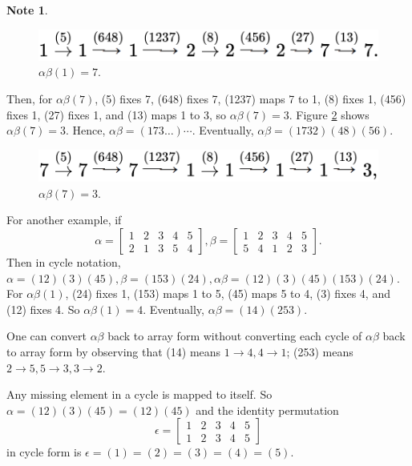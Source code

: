 \documentclass{article}
\theoremstyle{definition}
\newtheorem{note}{Note}[section]
\begin{document}
\begin{note}
 \begin{figure}[!htbp]
     \centering
     \includegraphics[width=0.5\linewidth]{figures/alphabeta(1).png}
     \caption{$\alpha\beta(1)=7$.}
     \label{alpha_beta(1)}
 \end{figure}
 
 Then, for $\alpha\beta(7)$, (5) fixes 7, (648) fixes 7, (1237) maps 7 to 1, (8) fixes 1, (456) fixes 1, (27) fixes 1, and (13) maps 1 to 3, so $\alpha\beta(7)=3$. Figure \ref{alpha_beta(7)} shows $\alpha\beta(7)=3$. Hence, $\alpha\beta = (173\dots)\cdots$. Eventually, $\alpha\beta = (1732)(48)(56)$.
 
 \begin{figure}[!htbp]
     \centering
     \includegraphics[width=0.5\linewidth]{figures/alphabeta(7).png}
     \caption{$\alpha\beta(7)=3$.}
     \label{alpha_beta(7)}
 \end{figure}
 
 For another example, if 
 \begin{equation*}
     \alpha = 
     \begin{bmatrix}
        1 & 2 & 3 & 4 & 5 \\
        2 & 1 & 3 & 5 & 4 
     \end{bmatrix},
     \beta = 
     \begin{bmatrix}
        1 & 2 & 3 & 4 & 5 \\
        5 & 4 & 1 & 2 & 3 
     \end{bmatrix}.
 \end{equation*}
 Then in cycle notation, $\alpha=(12)(3)(45), \beta=(153)(24), \alpha\beta=(12)(3)(45)(153)(24)$. For $\alpha\beta(1)$, (24) fixes 1, (153) maps 1 to 5, (45) maps 5 to 4, (3) fixes 4, and (12) fixes 4. So $\alpha\beta(1)=4$. Eventually, $\alpha\beta = (14)(253)$.
 
 One can convert $\alpha\beta$ back to array form without converting each cycle of $\alpha\beta$ back to array form by observing that (14) means $1 \to 4, 4 \to 1$; (253) means $2 \to 5, 5 \to 3, 3 \to 2$.
 
 Any missing element in a cycle is mapped to itself. So $\alpha = (12)(3)(45)=(12)(45)$ and the identity permutation
 \begin{equation*}
     \epsilon = 
     \begin{bmatrix}
        1 & 2 & 3 & 4 & 5 \\
        1 & 2 & 3 & 4 & 5 
     \end{bmatrix}
 \end{equation*}
 in cycle form is $\epsilon = (1) = (2) = (3) = (4) = (5)$.
  \end{note}
 
\end{document}
